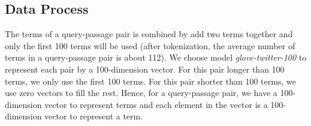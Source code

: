 \subsection{Data Process}
The terms of a query-passage pair is combined by add two terms together and only the first 100 terms will be used (after tokenization, the average number of terms in a query-passage pair is about 112). We choose model \textsl{glove-twitter-100} to represent each pair by a 100-dimension vector. For this pair longer than 100 terms, we only use the first 100 terms. For this pair shorter than 100 terms, we use zero vectors to fill the rest. Hence, for a query-passage pair, we have a 100-dimension vector to represent terms and each element in the vector is a 100-dimension vector to represent a term.